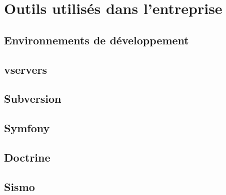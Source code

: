 \section{Outils utilisés dans l'entreprise}

\subsection{Environnements de développement}

\subsection{vservers}

\subsection{Subversion}


\subsection{Symfony}


\subsection{Doctrine}

\subsection{Sismo}
